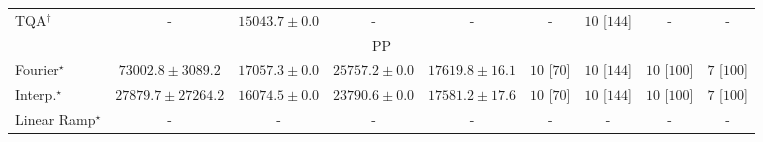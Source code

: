 \begin{tabular}{l|cccc|cccc|}
TQA$^\dagger$ & {\cellcolor[HTML]{000000}} \color[HTML]{F1F1F1} {\cellcolor{white}} \color{black} - & {\cellcolor[HTML]{FED471}} \color[HTML]{000000} $15043.7\pm 0.0$ & {\cellcolor[HTML]{000000}} \color[HTML]{F1F1F1} {\cellcolor{white}} \color{black} - & {\cellcolor[HTML]{000000}} \color[HTML]{F1F1F1} {\cellcolor{white}} \color{black} - & {\cellcolor[HTML]{000000}} \color[HTML]{F1F1F1} {\cellcolor{white}} \color{black} - & {\cellcolor[HTML]{49006A}} \color[HTML]{F1F1F1} $10$ [$144$] & {\cellcolor[HTML]{000000}} \color[HTML]{F1F1F1} {\cellcolor{white}} \color{black} - & {\cellcolor[HTML]{000000}} \color[HTML]{F1F1F1} {\cellcolor{white}} \color{black} - \\
\cline{1-9}
\multicolumn{9}{c}{\rule{0pt}{8pt}PP} \\
\midrule
Fourier$^\star$ & {\cellcolor[HTML]{004529}} \color[HTML]{F1F1F1} $73002.8\pm 3089.2$ & {\cellcolor[HTML]{BCE395}} \color[HTML]{000000} $17057.3\pm 0.0$ & {\cellcolor[HTML]{92D183}} \color[HTML]{000000} $25757.2\pm 0.0$ & {\cellcolor[HTML]{B9E294}} \color[HTML]{000000} $17619.8\pm 16.1$ & {\cellcolor[HTML]{49006A}} \color[HTML]{F1F1F1} $10$ [$70$] & {\cellcolor[HTML]{49006A}} \color[HTML]{F1F1F1} $10$ [$144$] & {\cellcolor[HTML]{49006A}} \color[HTML]{F1F1F1} $10$ [$100$] & {\cellcolor[HTML]{CD238F}} \color[HTML]{F1F1F1} $7$ [$100$] \\
Interp.$^\star$ & {\cellcolor[HTML]{88CD7F}} \color[HTML]{000000} $27879.7\pm 27264.2$ & {\cellcolor[HTML]{C0E597}} \color[HTML]{000000} $16074.5\pm 0.0$ & {\cellcolor[HTML]{9CD687}} \color[HTML]{000000} $23790.6\pm 0.0$ & {\cellcolor[HTML]{B9E294}} \color[HTML]{000000} $17581.2\pm 17.6$ & {\cellcolor[HTML]{49006A}} \color[HTML]{F1F1F1} $10$ [$70$] & {\cellcolor[HTML]{49006A}} \color[HTML]{F1F1F1} $10$ [$144$] & {\cellcolor[HTML]{49006A}} \color[HTML]{F1F1F1} $10$ [$100$] & {\cellcolor[HTML]{CD238F}} \color[HTML]{F1F1F1} $7$ [$100$] \\
Linear Ramp$^\star$ & {\cellcolor[HTML]{000000}} \color[HTML]{F1F1F1} {\cellcolor{white}} \color{black} - & {\cellcolor[HTML]{000000}} \color[HTML]{F1F1F1} {\cellcolor{white}} \color{black} - & {\cellcolor[HTML]{000000}} \color[HTML]{F1F1F1} {\cellcolor{white}} \color{black} - & {\cellcolor[HTML]{000000}} \color[HTML]{F1F1F1} {\cellcolor{white}} \color{black} - & {\cellcolor[HTML]{000000}} \color[HTML]{F1F1F1} {\cellcolor{white}} \color{black} - & {\cellcolor[HTML]{000000}} \color[HTML]{F1F1F1} {\cellcolor{white}} \color{black} - & {\cellcolor[HTML]{000000}} \color[HTML]{F1F1F1} {\cellcolor{white}} \color{black} - & {\cellcolor[HTML]{000000}} \color[HTML]{F1F1F1} {\cellcolor{white}} \color{black} - \\

\end{tabular}
